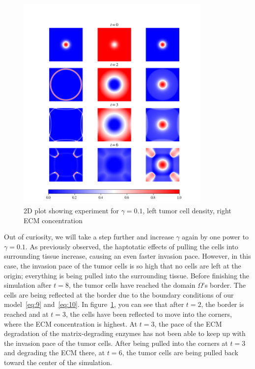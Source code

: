 \begin{figure}[h!]
 \centering
 \includegraphics[width=0.85\textwidth]{resources/images/gamma_2D_plot.png}
 \caption{2D plot showing experiment for $\gamma=0.1$, left tumor cell density, right ECM concentration}
 \label{fig:gamma_2D_plot}
\end{figure}
Out of curiosity, we will take a step further and increase $\gamma$ again by one power to $\gamma=0.1$. As previously observed, the haptotatic effects of pulling the cells into surrounding tissue increase, causing an even faster invasion pace. However, in this case, the invasion pace of the tumor cells is so high that no cells are left at the origin; everything is being pulled into the surrounding tissue. Before finishing the simulation after $t=8$, the tumor cells have reached the domain $\Omega$'s border. The cells are being reflected at the border due to the boundary conditions of our model~\ref{eq:9} and~\ref{eq:10}. In figure~\ref{fig:gamma_2D_plot}, you can see that after $t=2$, the border is reached and at $t=3$, the cells have been reflected to move into the corners, where the ECM concentration is highest. At $t=3$, the pace of the ECM degradation of the matrix-degrading enzymes has not been able to keep up with the invasion pace of the tumor cells. After being pulled into the corners at $t=3$ and degrading the ECM there, at $t=6$, the tumor cells are being pulled back toward the center of the simulation.


